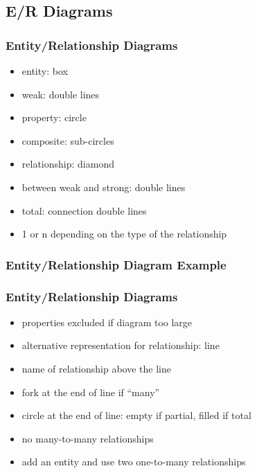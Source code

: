 \documentclass[dvipsnames]{beamer}
\begin{document}
\subsection{E/R Diagrams}

\begin{frame}
  \frametitle{Entity/Relationship Diagrams}

  \begin{itemize}
    \item entity: box
    \item weak: double lines

    \pause
    \medskip
    \item property: circle
    \item composite: sub-circles

    \pause
    \medskip
    \item relationship: diamond
    \item between weak and strong: double lines
    \item total: connection double lines
    \item 1 or n depending on the type of the relationship
 \end{itemize}
\end{frame}

\begin{frame}
  \frametitle{Entity/Relationship Diagram Example}

  \begin{center}
  \end{center}
\end{frame}

\begin{frame}
  \frametitle{Entity/Relationship Diagrams}

  \begin{itemize}
    \item properties excluded if diagram too large

    \bigskip
    \item alternative representation for relationship: line
    \item name of relationship above the line
    \item fork at the end of line if ``many''
    \item circle at the end of line: empty if partial, filled if total

    \medskip
    \item no many-to-many relationships
    \item add an entity and use two one-to-many relationships
 \end{itemize}
\end{frame}
\end{document}
